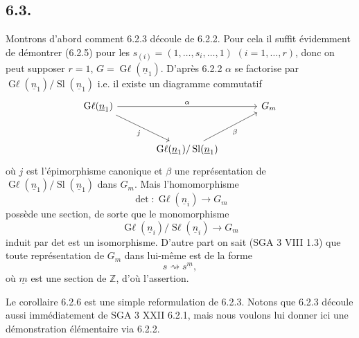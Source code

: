 \documentclass{article}
\begin{document}
\clearpage
\subsection*{6.3.}
Montrons d'abord comment 6.2.3 découle de 6.2.2. Pour cela il suffit évidemment de démontrer (6.2.5) pour les
\(s_{(i)}=(1,\ldots,s_i,\ldots,1)\) \((i=1,\ldots,r)\), donc on peut supposer \(r=1\), \(G=\operatorname{G\ell}(\underline{n}_1)\). D'après 6.2.2 \(\alpha\) se factorise par \(\operatorname{G\ell}(\underline{n}_1)/\operatorname{Sl}(\underline{n}_1)\) i.e. il existe un diagramme commutatif
\[
\begin{tikzcd}[column sep=large,row sep=large]
\operatorname{G\ell}(\underline{n}_1) \arrow[rr,"\alpha"] \arrow[dr,"j"'] && {G}_m\\
& \operatorname{G\ell}(\underline{n}_1)/\operatorname{Sl}(\underline{n}_1) \arrow[ur,"\beta"'] &
\end{tikzcd}
\]
où \(j\) est l'épimorphisme canonique et \(\beta\) une représentation de \(\operatorname{G\ell}(\underline{n}_1)/\operatorname{Sl}(\underline{n}_1)\) dans \({G}_m\). Mais l'homomorphisme
\[
 \det:\operatorname{G\ell}(\underline{n}_i)\longrightarrow{G}_m
\]
possède une section, de sorte que le monomorphisme
\[
 \operatorname{G\ell}(\underline{n}_i)/\operatorname{S\ell}(\underline{n}_i)\longrightarrow{G}_m
\]
induit par det est un isomorphisme. D'autre part on sait (SGA 3 VIII 1.3) que toute représentation de \({G}_m\) dans lui-même est de la forme
\[
 s\rightsquigarrow s^{\underline{m}},
\]
où \(\underline{m}\) est une section de \(\mathbb Z\), d'où l'assertion.

Le corollaire 6.2.6 est une simple reformulation de 6.2.3. Notons que 6.2.3 découle aussi immédiatement de SGA 3 XXII 6.2.1, mais nous voulons lui donner ici une démonstration élémentaire via 6.2.2.
\end{document}
